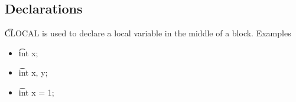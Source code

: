\subsection{Declarations}
\t{CLOCAL} is used to declare a local variable in the middle of a block.
Examples
\begin{itemize}
    \item \t{int x;} \to\ 
    \item \t{int x, y;} \to\ 
    \item \t{int x = 1;} \to\ 
\end{itemize}
